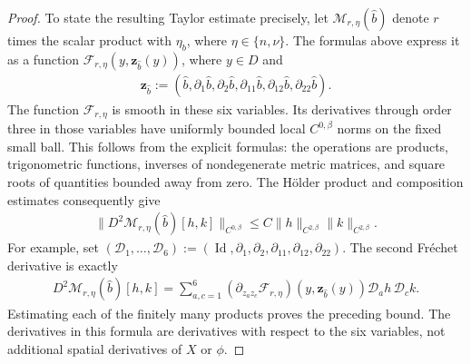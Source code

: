 \documentclass[a4paper,11pt,oneside,reqno]{amsart}
\numberwithin{equation}{section}
\theoremstyle{definition}
\begin{document}
\begin{proof}
    To state the resulting Taylor estimate precisely, let
    $\mathcal M_{r,\eta}(\widehat b)$ denote $r$ times the
    scalar product with $\eta_b$, where $\eta\in\{n,\nu\}$.
    The formulas above express it as a function
    $\mathcal F_{r,\eta}(y,\mathbf z_{\widehat b}(y))$,
    where $y\in D$ and
    \begin{align*}
        \mathbf z_{\widehat b}
        :=(\widehat b,\partial_1\widehat b,
          \partial_2\widehat b,\partial_{11}\widehat b,
          \partial_{12}\widehat b,\partial_{22}\widehat b).
    \end{align*}
    The function $\mathcal F_{r,\eta}$ is smooth in these
    six variables. Its derivatives through order three in
    those variables have uniformly bounded local
    $C^{0,\beta}$ norms on the fixed small ball. This follows
    from the explicit formulas: the operations are products,
    trigonometric functions, inverses of nondegenerate metric
    matrices, and square roots of quantities bounded away
    from zero. The H\"older product and composition estimates
    consequently give
    \begin{align*}
        \|D^2\mathcal M_{r,\eta}(\widehat b)
        [h,k]\|_{C^{0,\beta}}
        \leq C\|h\|_{C^{2,\beta}}\|k\|_{C^{2,\beta}}.
    \end{align*}
    For example, set
    $(\mathcal D_1,\ldots,\mathcal D_6)
    :=(\operatorname{Id},\partial_1,\partial_2,
         \partial_{11},\partial_{12},\partial_{22})$.
    The second Fr\'echet derivative is exactly
    \begin{align*}
        D^2\mathcal M_{r,\eta}(\widehat b)[h,k]
        =\sum_{a,c=1}^6
        (\partial_{z_a z_c}\mathcal F_{r,\eta})
            (y,\mathbf z_{\widehat b}(y))
        \mathcal D_a h\,\mathcal D_c k.
    \end{align*}
    Estimating each of the finitely many products proves the
    preceding bound. The derivatives in this formula are
    derivatives with respect to the six variables, not
    additional spatial derivatives of $X$ or $\phi$.


\end{proof}
\end{document}
